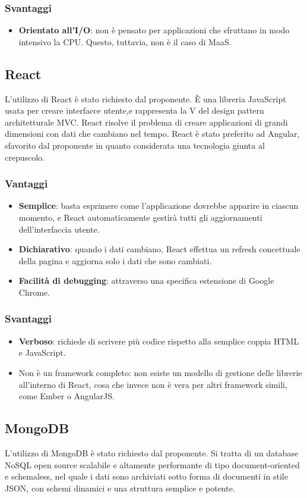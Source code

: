 \subsubsection{Svantaggi}
\begin{itemize}
\item \textbf{Orientato all'I/O}: non \`e pensato per applicazioni che sfruttano in modo intensivo la CPU. Questo, tuttavia, non \`e il caso di MaaS.
\end{itemize}
\subsection{React}
L'utilizzo di React \`e stato richiesto dal proponente. \`E una libreria JavaScript usata per creare interfacce utente,e rappresenta la V del design pattern architetturale MVC. React risolve il problema di creare applicazioni di grandi dimensioni con dati che cambiano nel tempo.
React \`e stato preferito ad Angular, sfavorito dal proponente in quanto considerata una tecnologia giunta al crepuscolo.
\subsubsection{Vantaggi}
\begin{itemize}
\item \textbf{Semplice}: basta esprimere come l'applicazione dovrebbe apparire in ciascun momento, e React automaticamente gestir\`a tutti gli aggiornamenti dell'interfaccia utente.
\item \textbf{Dichiarativo}: quando i dati cambiano, React effettua un refresh concettuale della pagina e aggiorna solo i dati che sono cambiati.
\item \textbf{Facilit\`a di debugging}: attraverso una specifica estensione di Google Chrome.
\end{itemize}
\subsubsection{Svantaggi}
\begin{itemize}
\item \textbf{Verboso}: richiede di scrivere pi\`u codice rispetto alla semplice coppia HTML e JavaScript.
\item{Non \`e un framework completo}: non esiste un modello di gestione delle librerie all'interno di React, cosa che invece non \`e vera per altri framework simili, come Ember o AngularJS.
\end{itemize}
\subsection{MongoDB}
L'utilizzo di MongoDB \`e stato richiesto dal proponente. Si tratta di un database NoSQL open source scalabile e altamente performante di tipo document-oriented e schemaless, nel quale i dati sono archiviati sotto forma di documenti in stile JSON, con schemi dinamici e una struttura semplice e potente.
